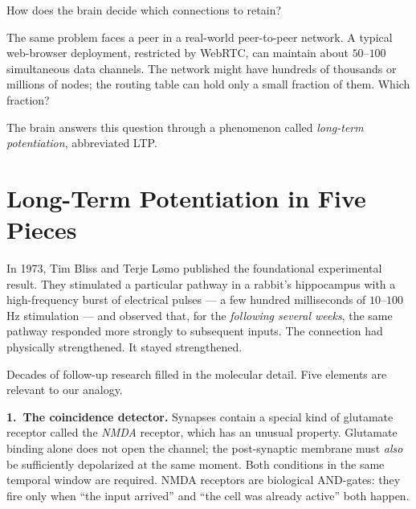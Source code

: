 \documentclass[twoside,nobib]{tufte-book}
\begin{document}
How does the brain decide which connections to retain?

The same problem faces a peer in a real-world peer-to-peer
network. A typical web-browser deployment, restricted by WebRTC,
can maintain about $50$--$100$ simultaneous data
channels. The network might have hundreds of
thousands or millions of nodes; the routing table can hold only a
small fraction of them. Which fraction?

The brain answers this question through a phenomenon called
\emph{long-term potentiation}, abbreviated LTP.

\section{Long-Term Potentiation in Five Pieces}

In 1973, Tim Bliss and Terje L\o mo published the foundational
experimental result. They stimulated a particular
pathway in a rabbit's hippocampus with a high-frequency burst of
electrical pulses --- a few hundred milliseconds of
$10$--$100$\,Hz stimulation --- and observed that, for the
\emph{following several weeks}, the same pathway responded more
strongly to subsequent inputs. The connection had physically
strengthened. It stayed strengthened.

Decades of follow-up research filled in the molecular detail.
Five elements are relevant to our analogy.

\textbf{1.\ The coincidence detector.} Synapses contain a special
kind of glutamate receptor called the
\emph{NMDA} receptor, which has an unusual property. Glutamate
binding alone does not open the channel; the post-synaptic
membrane must \emph{also} be sufficiently depolarized at the same
moment. Both conditions in the same temporal
window are required. NMDA receptors are
biological AND-gates: they fire only when ``the input arrived''
and ``the cell was already active'' both happen.
\end{document}
